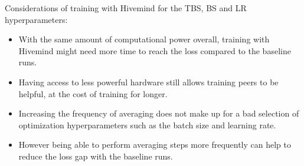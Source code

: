 Considerations of training with Hivemind for the TBS, BS and LR hyperparameters:

\begin{itemize}
    \item With the same amount of computational power overall, training with Hivemind might need more time to reach the loss compared to the baseline runs.
    \item Having access to less powerful hardware still allows training peers to be helpful, at the cost of training for longer.
    \item Increasing the frequency of averaging does not make up for a bad selection of optimization hyperparameters such as the batch size and learning rate.
    \item However being able to perform averaging steps more frequently can help to reduce the loss gap with the baseline runs.
\end{itemize}
